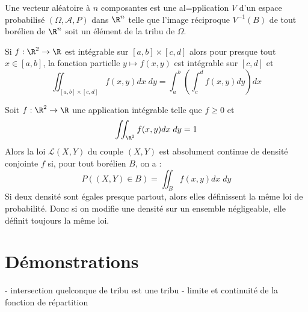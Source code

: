 
\minitoc  %








\begin{definition}
    Une vecteur aléatoire à $n$ composantes est une al=pplication $V$ d'un espace probabilisé $(\Omega, \mathcal{A}, P)$ dans $\R^n$ telle que l'image réciproque $V^{-1}(B)$ de tout borélien de $\R^n$ soit un élément de la tribu de $\Omega$.
\end{definition}

\begin{theorem}[Fubini]
    Si $ f : \R^2 \rightarrow \R $ est intégrable sur $[a, b] \times [c, d]$ alors pour presque tout $x \in [a, b]$, la fonction partielle $ y \mapsto f(x, y)$ est intégrable sur $[c, d]$ et 
        \[ \iint_{[a, b] \times [c, d]} f(x, y) dx \; dy = \int_{a}^{b} \left( \int_{c}^{d} f(x, y) dy \right) dx \]
\end{theorem}

\begin{definition}
    Soit $ f : \R^2 \rightarrow \R $ une application intégrable telle que $f \geq 0$ et 
        \[ \iint_{\R^2} f(x, y) dx \; dy = 1 \]
    Alors la loi $\mathcal{L}(X, Y)$ du couple $(X, Y)$ est absolument continue de densité conjointe $f$ si, pour tout borélien $B$, on a :
        \[ P((X, Y) \in B) = \iint_B f(x, y) dx \; dy \]
    Si deux densité sont égales presque partout, alors elles définissent la même loi de probabilité. Donc si on modifie une densité sur un ensemble négligeable, elle définit toujours la même loi.
\end{definition}













\section*{Démonstrations}

- intersection quelconque de tribu est une tribu
- limite et continuité de la fonction de répartition


